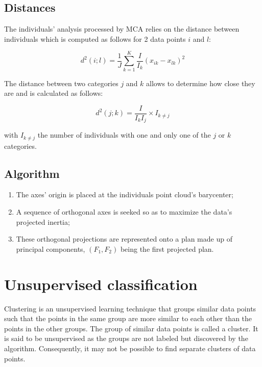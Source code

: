 \documentclass[
]{book}
\providecommand{\tightlist}{%
  \setlength{\itemsep}{0pt}\setlength{\parskip}{0pt}}
\begin{document}
\hypertarget{distances}{%
\subsection{Distances}\label{distances}}

The individuals' analysis processed by MCA relies on the distance between individuals which is computed as follows for 2 data points \(i\) and \(l\):

\begin{equation}
  d^2(i;l) = \frac{1}{J}\sum_{k=1}^K \frac{I}{I_k}(x_{ik} - x_{lk})^2
  \label{eq:mcaDist1}
\end{equation}

The distance between two categories \(j\) and \(k\) allows to determine how close they are and is calculated as follows:

\begin{equation}
  d^2(j;k) = \frac{I}{I_k I_j}\times I_{k\neq j}
  \label{eq:mcaDist2}
\end{equation}

with \(I_{k\neq j}\) the number of individuals with one and only one of the \(j\) or \(k\) categories.

\hypertarget{algorithm}{%
\subsection{Algorithm}\label{algorithm}}

\begin{enumerate}
\def\labelenumi{\arabic{enumi}.}
\tightlist
\item
  The axes' origin is placed at the individuals point cloud's barycenter;
\item
  A sequence of orthogonal axes is seeked so as to maximize the data's projected inertia;
\item
  These orthogonal projections are represented onto a plan made up of principal components, \((F_1, F_2)\) being the first projected plan.
\end{enumerate}

\hypertarget{unsupervised-classification}{%
\section{Unsupervised classification}\label{unsupervised-classification}}

Clustering is an unsupervised learning technique that groups similar data points such that the points in the same group are more similar to each other than the points in the other groups. The group of similar data points is called a cluster. It is said to be unsupervised as the groups are not labeled but discovered by the algorithm. Consequently, it may not be possible to find separate clusters of data points.
\end{document}
